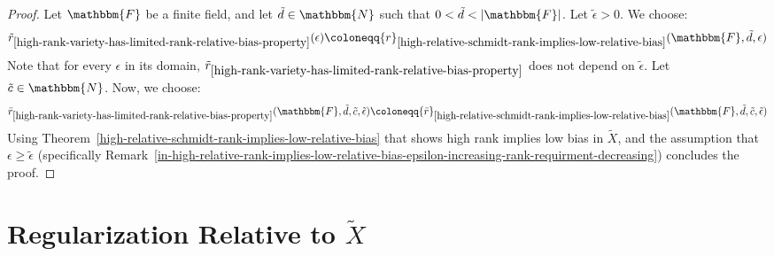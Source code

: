 \documentclass[10pt,a4paper]{article}
\newcommand{\definedas}[0]{\coloneqq}
\newcommand{\basefield}[0]{\mathbbm{F}}
\newcommand{\degree}[0]{d}
\newcommand{\naturalnumbersset}[0]{\mathbbm{N}}
\newcommand{\variety}{{\tilde{X}}}
\newcommand{\titlevariety}{\texorpdfstring{$\variety$}{X}}
\newcommand{\varietypolycount}{{\tilde{c}}}
\newcommand{\varietydeg}[0]{\tilde{\degree}}
\newcommand{\rankval}[0]{{{r}}}
\newcommand{\rankbiasfunc}[0]{{\tilde{r}}}
\newcommand{\varietyrankval}[0]{{\bar{r}}}
\newcommand{\epsilonlimitedrankbias}[0]{{\tilde{\epsilon}}}
\newcommand{\abs}[1]{\left| #1 \right|}
\begin{document}
\begin{proof}
    Let $\basefield$ be a finite field, and let $\varietydeg \in \naturalnumbersset$ such that $0 < \varietydeg < \abs{\basefield}$.
    Let $\epsilonlimitedrankbias > 0$.
    We choose:
    \[
        \rankbiasfunc_{\ref{high-rank-variety-has-limited-rank-relative-bias-property}}(\epsilon) \definedas
        \rankval_{\ref{high-relative-schmidt-rank-implies-low-relative-bias}}(\basefield, \varietydeg, \epsilon)
    \]
    Note that for every $\epsilon$ in its domain, $\rankbiasfunc_{\ref{high-rank-variety-has-limited-rank-relative-bias-property}}$ does not depend on $\epsilonlimitedrankbias$.
    Let $\varietypolycount \in \naturalnumbersset$.
    Now, we choose:
    \[
        \varietyrankval_{\ref{high-rank-variety-has-limited-rank-relative-bias-property}}(\basefield, \varietydeg, \varietypolycount, \epsilonlimitedrankbias) \definedas
        \varietyrankval_{\ref{high-relative-schmidt-rank-implies-low-relative-bias}}(\basefield, \varietydeg, \varietypolycount, \epsilonlimitedrankbias)
    \]
    Using Theorem~\ref{high-relative-schmidt-rank-implies-low-relative-bias} that shows high rank implies low bias in $\variety$,
    and the assumption that $\epsilon \geq \epsilonlimitedrankbias$ (specifically Remark~\ref{in-high-relative-rank-implies-low-relative-bias-epsilon-increasing-rank-requirment-decreasing})
    concludes the proof.
\end{proof}


\section[Regularization Relative to \titlevariety]{Regularization Relative to \titlevariety}\label{sec:regularization-relative-to-X}
\end{document}
